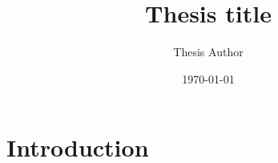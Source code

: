 \documentclass[a4paper]{article}
\begin{document}
\title{Thesis title}
\author{Thesis Author}
\date{\today}
\newcommand{\supervisor}{Supervisor Name}
\newcommand{\thesisyear}{2021}
\newcommand{\thesisnumber}{\#\#}



\section{Introduction}
\end{document}
